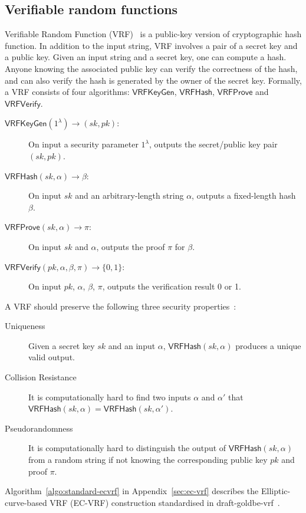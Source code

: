 \subsection{Verifiable random functions}

Verifiable Random Function (VRF)~\cite{micali1999verifiable} is a public-key version of cryptographic hash function.
In addition to the input string, VRF involves a pair of a secret key and a public key.
Given an input string and a secret key, one can compute a hash.
Anyone knowing the associated public key can verify the correctness of the hash, and can also verify the hash is generated by the owner of the secret key.
Formally, a VRF consists of four algorithms: $\mathsf{VRFKeyGen}$, $\mathsf{VRFHash}$, $\mathsf{VRFProve}$ and $\mathsf{VRFVerify}$.

\begin{description}
    \item [$\mathsf{VRFKeyGen}(1^{\lambda}) \to (sk, pk)$:] On input a security parameter $1^{\lambda}$, outputs the secret/public key pair $(sk, pk)$.
    \item [$\mathsf{VRFHash}(sk, \alpha) \to \beta $:] On input $sk$ and an arbitrary-length string $\alpha$, outputs a fixed-length hash $\beta$.
    \item [$\mathsf{VRFProve}(sk, \alpha) \to \pi$:] On input $sk$ and $\alpha$, outputs the proof $\pi$ for $\beta$.
    \item [$\mathsf{VRFVerify}(pk, \alpha, \beta, \pi) \to \{0, 1\}$:] On input $pk$, $\alpha$, $\beta$, $\pi$, outputs the verification result 0 or 1.
\end{description}

A VRF should preserve the following three security properties~\cite{goldberg2017draft}:

\begin{description}
    \item[Uniqueness] Given a secret key $sk$ and an input $\alpha$, $\mathsf{VRFHash}(sk, \alpha)$ produces a unique valid output.
    \item[Collision Resistance] It is computationally hard to find two inputs $\alpha$ and $\alpha'$ that $\mathsf{VRFHash}(sk, \alpha) = \mathsf{VRFHash}(sk, \alpha')$.
    \item[Pseudorandomness] It is computationally hard to distinguish the output of $\mathsf{VRFHash}(sk, \alpha)$ from a random string if not knowing the corresponding public key $pk$ and proof $\pi$.
\end{description}

Algorithm~\ref{algo:standard-ecvrf} in Appendix~\ref{sec:ec-vrf} describes the Elliptic-curve-based VRF (EC-VRF) construction standardised in draft-goldbe-vrf~\cite{goldberg2017draft}.
